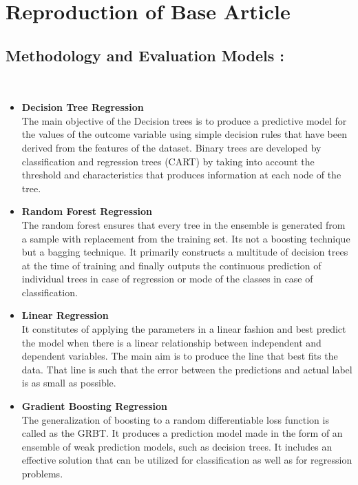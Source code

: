 \documentclass{article}
\begin{document}
\newpage
\section {Reproduction of Base Article}

\subsection {\color{brown}
\textbf{Methodology and Evaluation Models} :} \\ 
\begin{itemize}

\item \textbf{Decision Tree Regression} \\ 
The main objective of the Decision trees is to produce a predictive model for the values of the outcome  variable using  simple decision rules that have been derived from the features of the dataset. Binary trees are developed by classification and regression trees (CART) by taking into account the threshold and characteristics that produces information at each node of the tree. 

\item \textbf{Random Forest Regression} \\ 
 The random forest ensures that every tree in the ensemble is generated  from  a  sample  with  replacement   from  the  training  set. Its not a boosting technique but a bagging technique. It primarily constructs a multitude of decision trees at the time of training and finally outputs the continuous prediction of individual trees in case of regression or mode of the classes in case of classification. 

\item \textbf{Linear Regression} \\ 
 It constitutes of applying the parameters in a linear fashion and best predict the model when there is a linear relationship between independent and dependent variables. The main aim is to produce the line that best fits the data. That line is such that the error between the predictions and actual label is as small as possible. 

\item \textbf{Gradient Boosting Regression} \\ 
  The generalization  of  boosting  to  a random differentiable loss  function  is  called  as  the  GRBT. It produces a prediction model made in the form of an ensemble of weak prediction models, such as decision trees. It includes an effective solution that can be utilized for classification as well as for regression problems. 
\end{itemize}
\\
\end{document}
